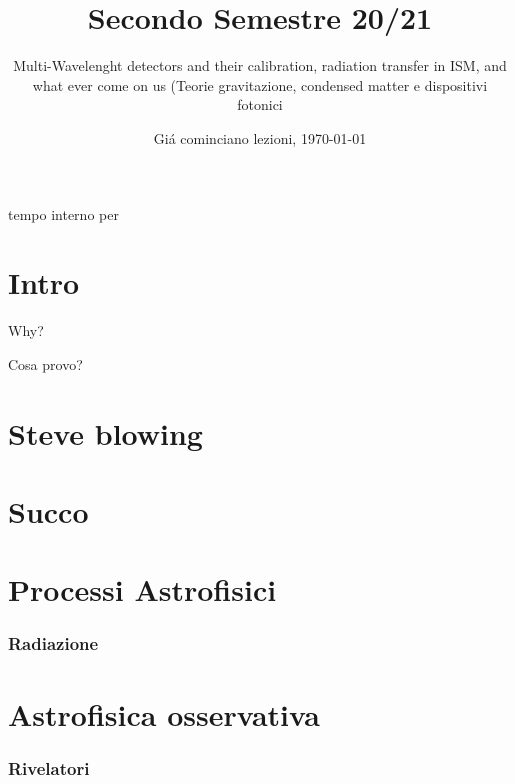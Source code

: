 \documentclass[10pt,xcolor={usenames},fleqn,mathserif,serif]{beamer}
\title{Secondo Semestre 20/21}
\subtitle{Multi-Wavelenght detectors and their calibration, radiation transfer in ISM, and what ever come on us (Teorie gravitazione, condensed matter e dispositivi fotonici}
\date{Gi\'a cominciano lezioni, \today}
\begin{document}


\begin{frame}
  \titlepage
\end{frame}

\begin{frame}{tempo interno per}
\tableofcontents[onlyparts]
\end{frame}


\part{Intro}

\begin{frame}[label={why}]{Why?}

\end{frame}

\begin{wordonframe}{Cosa provo?}

\end{wordonframe}

\part{Steve blowing}


\part{Succo}


\part{Processi Astrofisici}
\section{Radiazione}


\part{Astrofisica osservativa}
\section{Rivelatori}
%

%
\end{document}
